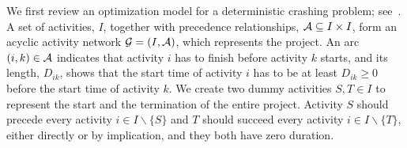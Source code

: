 \documentclass[11pt]{article}
\newcommand{\cA}{{\cal A}}
\newcommand{\noi}{\noindent}
\begin{document}
	\noi We first review an optimization model for a deterministic crashing problem; see~\citet{fulkerson1961network, kelley1961criticalpath}. A set of activities, \(I\), together with precedence relationships, \(\cA \subseteq I \times I\), form an acyclic activity network \(\mathcal{G} = (I,\cA)\), which represents the project. An arc \((i,k) \in \cA\) indicates that activity \(i\) has to finish before activity \(k\) starts, and its length, \(D_{ik}\), shows that the start time of activity \(i\) has to be at least \(D_{ik} \ge 0\) before the start time of activity \(k\). We create two dummy activities \(S, T \in I\) to represent the start and the termination of the entire project. Activity \(S\) should precede every activity \(i \in I \backslash \{S\}\) and \(T\) should succeed every activity \(i \in I \backslash \{T\}\), either directly or by implication, and they both have zero duration.
	
\end{document}
